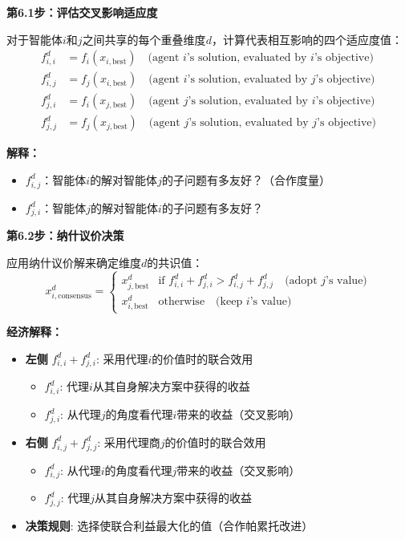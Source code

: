 \documentclass[11pt,a3paper]{ctexart}
\begin{document}
\textbf{第6.1步：评估交叉影响适应度}

对于智能体$i$和$j$之间共享的每个重叠维度$d$，计算代表相互影响的四个适应度值：
\begin{align}
f_{i,i}^d &= f_i(x_{i,\text{best}}) \quad \text{(agent } i\text{'s solution, evaluated by } i\text{'s objective)} \\
f_{i,j}^d &= f_j(x_{i,\text{best}}) \quad \text{(agent } i\text{'s solution, evaluated by } j\text{'s objective)} \\
f_{j,i}^d &= f_i(x_{j,\text{best}}) \quad \text{(agent } j\text{'s solution, evaluated by } i\text{'s objective)} \\
f_{j,j}^d &= f_j(x_{j,\text{best}}) \quad \text{(agent } j\text{'s solution, evaluated by } j\text{'s objective)}
\end{align}

\textbf{解释：}
\begin{itemize}
    \item $f_{i,j}^d$：智能体$i$的解对智能体$j$的子问题有多友好？（合作度量）
    \item $f_{j,i}^d$：智能体$j$的解对智能体$i$的子问题有多友好？
\end{itemize}

\textbf{第6.2步：纳什议价决策}

应用纳什议价解来确定维度$d$的共识值：
\begin{equation}
x_{i,\text{consensus}}^d = \begin{cases}
x_{j,\text{best}}^d & \text{if } f_{i,i}^d + f_{j,i}^d > f_{i,j}^d + f_{j,j}^d \quad \text{(adopt } j\text{'s value)} \\
x_{i,\text{best}}^d & \text{otherwise} \quad \text{(keep } i\text{'s value)}
\end{cases}
\end{equation}

\textbf{经济解释：}
\begin{itemize}
    \item \textbf{左侧} $f_{i,i}^d + f_{j,i}^d$: 采用代理$i$的价值时的联合效用
    \begin{itemize}
        \item $f_{i,i}^d$: 代理$i$从其自身解决方案中获得的收益
        \item $f_{j,i}^d$: 从代理$j$的角度看代理$i$带来的收益（交叉影响）
    \end{itemize}
    \item \textbf{右侧} $f_{i,j}^d + f_{j,j}^d$: 采用代理商$j$的价值时的联合效用
    \begin{itemize}
        \item $f_{i,j}^d$: 从代理$i$的角度看代理$j$带来的收益（交叉影响）
        \item $f_{j,j}^d$: 代理$j$从其自身解决方案中获得的收益
    \end{itemize}
    \item \textbf{决策规则}: 选择使联合利益最大化的值（合作帕累托改进）
\end{itemize}
\end{document}

